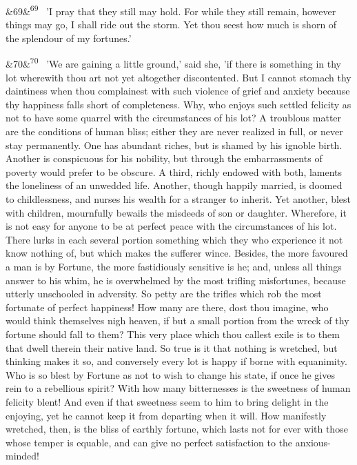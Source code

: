 \documentclass[12pt]{article}
\newcommand{\para}[1][]{\par\noindent\ifx&#1&\else\textsuperscript{\footnotesize #1}~\fi}
\begin{document}
\para[69] 'I pray that they still may hold. For while they still remain, however things may go, I shall ride out the storm. Yet thou seest how much is shorn of the splendour of my fortunes.'

\para[70] 'We are gaining a little ground,' said she, 'if there is something in thy lot wherewith thou art not yet altogether discontented. But I cannot stomach thy daintiness when thou complainest with such violence of grief and anxiety because thy happiness falls short of completeness. Why, who enjoys such settled felicity as not to have some quarrel with the circumstances of his lot? A troublous matter are the conditions of human bliss; either they are never realized in full, or never stay permanently. One has abundant riches, but is shamed by his ignoble birth. Another is conspicuous for his nobility, but through the embarrassments of poverty would prefer to be obscure. A third, richly endowed with both, laments the loneliness of an unwedded life. Another, though happily married, is doomed to childlessness, and nurses his wealth for a stranger to inherit. Yet another, blest with children, mournfully bewails the misdeeds of son or daughter. Wherefore, it is not easy for anyone to be at perfect peace with the circumstances of his lot. There lurks in each several portion something which they who experience it not know nothing of, but which makes the sufferer wince. Besides, the more favoured a man is by Fortune, the more fastidiously sensitive is he; and, unless all things answer to his whim, he is overwhelmed by the most trifling misfortunes, because utterly unschooled in adversity. So petty are the trifles which rob the most fortunate of perfect happiness! How many are there, dost thou imagine, who would think themselves nigh heaven, if but a small portion from the wreck of thy fortune should fall to them? This very place which thou callest exile is to them that dwell therein their native land. So true is it that nothing is wretched, but thinking makes it so, and conversely every lot is happy if borne with equanimity. Who is so blest by Fortune as not to wish to change his state, if once he gives rein to a rebellious spirit? With how many bitternesses is the sweetness of human felicity blent! And even if that sweetness seem to him to bring delight in the enjoying, yet he cannot keep it from departing when it will. How manifestly wretched, then, is the bliss of earthly fortune, which lasts not for ever with those whose temper is equable, and can give no perfect satisfaction to the anxious-minded!
\end{document}

